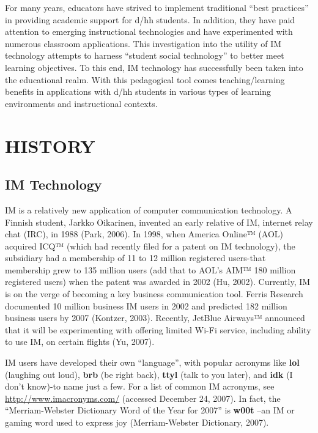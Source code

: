 \documentclass[11.5pt]{sig-alternate} %
\begin{document}
\begin{large}
For many years, educators have strived to implement traditional ``best practices'' in providing academic support for d/hh students. In addition, they have paid attention to emerging instructional technologies and have experimented with numerous classroom applications. This investigation into the utility of IM technology attempts to harness ``student social technology'' to better meet learning objectives. To this end, IM technology has successfully been taken into the educational realm. With this pedagogical tool comes teaching/learning benefits in applications with d/hh students in various types of learning environments and instructional contexts. 

\section*{HISTORY}
 
\subsection*{IM Technology}

IM is a relatively new application of computer communication technology. A Finnish student, Jarkko Oikarinen, invented an early relative of IM, internet relay chat (IRC), in 1988 (Park, 2006). In 1998, when America Online™ (AOL) acquired ICQ™ (which had recently filed for a patent on IM technology), the subsidiary had a membership of 11 to 12 million registered users-that membership grew to 135 million users (add that to AOL’s AIM™ 180 million registered users) when the patent was awarded in 2002 (Hu, 2002). Currently, IM is on the verge of becoming a key business communication tool. Ferris Research documented 10 million business IM users in 2002 and predicted 182 million business users by 2007 (Kontzer, 2003). Recently, JetBlue Airways™ announced that it will be experimenting with offering limited Wi-Fi service, including ability to use IM, on certain flights (Yu, 2007). 

IM users have developed their own “language”, with popular acronyms like \textbf{lol} (laughing out loud), \textbf{brb} (be right back), \textbf{ttyl} (talk to you later), and \textbf{idk} (I don’t know)-to name just a few. For a list of common IM acronyms, see \url{http://www.imacronyms.com/} (accessed December 24, 2007). In fact, the “Merriam-Webster Dictionary Word of the Year for 2007” is \textbf{w00t} –an IM or gaming word used to express joy (Merriam-Webster Dictionary, 2007). 


\end{large}
\end{document}
